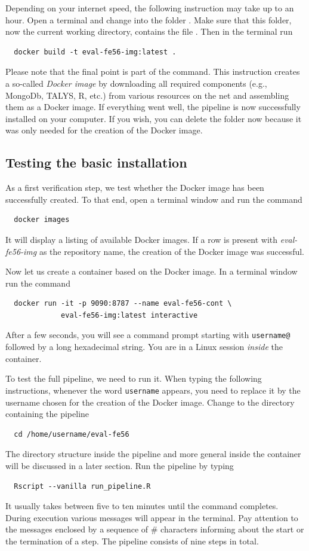 \documentclass[12pt,a4paper]{scrartcl}
\begin{document}
 Depending on your internet speed, the following instruction may take up to an hour.
 Open a terminal and change into the folder .
 Make sure that this folder, now the current working directory, contains the file .
Then in the terminal run
\begin{verbatim}
  docker build -t eval-fe56-img:latest . 
\end{verbatim}
 Please note that the final point is part of the command.
 This instruction creates a so-called \textit{Docker image} by downloading all required components (e.g., MongoDb, TALYS, R, etc.) from various resources on the net and assembling them as a Docker image.
 If everything went well, the pipeline is now successfully installed on your computer.
 If you wish, you can delete the folder  now because it was only needed for the creation of the Docker image.

 \subsection{Testing the basic installation}
 \label{subsec:test_basic_install}
 As a first verification step, we test whether the Docker image has been successfully created.
 To that end, open a terminal window and run the command
\begin{verbatim}
  docker images
\end{verbatim}
 It will display a listing of available Docker images.
 If a row is present with \textit{eval-fe56-img} as the repository name, the creation of the Docker image was successful.
 
 Now let us create a container based on the Docker image.
 In a terminal window run the command
\begin{verbatim}
  docker run -it -p 9090:8787 --name eval-fe56-cont \
             eval-fe56-img:latest interactive
\end{verbatim}
 After a few seconds, you will see a command prompt starting with \verb#username@# followed by a long hexadecimal string.
 You are in a Linux session \textit{inside} the container.
 
 To test the full pipeline, we need to run it.
 When typing the following instructions, whenever the word \verb#username# appears, you need to replace it by the username chosen for the creation of the Docker image.
 Change to the directory containing the pipeline
\begin{verbatim}
  cd /home/username/eval-fe56
\end{verbatim}
  The directory structure inside the pipeline and more general inside the container will be discussed in a later section.
  Run the pipeline by typing
\begin{verbatim}
  Rscript --vanilla run_pipeline.R
\end{verbatim}
It usually takes between five to ten minutes until the command completes.
During execution various messages will appear in the terminal.
Pay attention to the messages enclosed by a sequence of \# characters informing about the start or the termination of a step.
The pipeline consists of nine steps in total.
\end{document}
